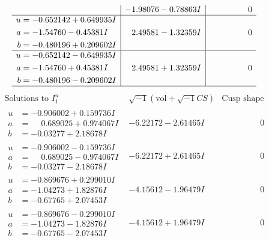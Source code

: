 \documentclass[1p]{elsarticle_modified}
\theoremstyle{definition}
\newcommand{\I}{\sqrt{-1}}
\begin{document}
$$\begin{array}{c|c|c}
 & -1.98076 - 0.78863 I & \phantom{-0.000000 } 0 \\ \hline\begin{aligned}
u &= -0.652142 + 0.649935 I \\
a &= -1.54760 - 0.45381 I \\
b &= -0.480196 + 0.209602 I\end{aligned}
 & \phantom{-}2.49581 - 1.32359 I & \phantom{-0.000000 } 0 \\ \hline\begin{aligned}
u &= -0.652142 - 0.649935 I \\
a &= -1.54760 + 0.45381 I \\
b &= -0.480196 - 0.209602 I\end{aligned}
 & \phantom{-}2.49581 + 1.32359 I & \phantom{-0.000000 } 0\\
 \hline 
 \end{array}$$\newpage$$\begin{array}{c|c|c}  
\text{Solutions to }I^u_{1}& \I (\text{vol} + \sqrt{-1}CS) & \text{Cusp shape}\\
 \hline 
\begin{aligned}
u &= -0.906002 + 0.159736 I \\
a &= \phantom{-}0.689025 + 0.974067 I \\
b &= -0.03277 + 2.18678 I\end{aligned}
 & -6.22172 - 2.61465 I & \phantom{-0.000000 } 0 \\ \hline\begin{aligned}
u &= -0.906002 - 0.159736 I \\
a &= \phantom{-}0.689025 - 0.974067 I \\
b &= -0.03277 - 2.18678 I\end{aligned}
 & -6.22172 + 2.61465 I & \phantom{-0.000000 } 0 \\ \hline\begin{aligned}
u &= -0.869676 + 0.299010 I \\
a &= -1.04273 + 1.82876 I \\
b &= -0.67765 + 2.07453 I\end{aligned}
 & -4.15612 - 1.96479 I & \phantom{-0.000000 } 0 \\ \hline\begin{aligned}
u &= -0.869676 - 0.299010 I \\
a &= -1.04273 - 1.82876 I \\
b &= -0.67765 - 2.07453 I\end{aligned}
 & -4.15612 + 1.96479 I & \phantom{-0.000000 } 0 \\ \hline\begin{aligned}

\end{aligned}
\end{array}$$
\end{document}
